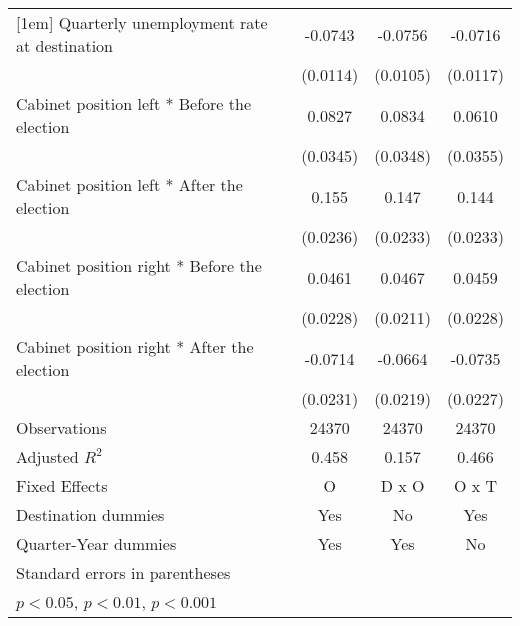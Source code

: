 \begin{table}[htbp]
\begin{tabular}{l*{3}{c}}
[1em]
Quarterly unemployment rate at destination&     -0.0743\sym{***}&     -0.0756\sym{***}&     -0.0716\sym{***}\\
                    &    (0.0114)         &    (0.0105)         &    (0.0117)         \\
[1em]
Cabinet position left * Before the election&      0.0827\sym{*}  &      0.0834\sym{*}  &      0.0610         \\
                    &    (0.0345)         &    (0.0348)         &    (0.0355)         \\
[1em]
Cabinet position left * After the election&       0.155\sym{***}&       0.147\sym{***}&       0.144\sym{***}\\
                    &    (0.0236)         &    (0.0233)         &    (0.0233)         \\
[1em]
Cabinet position right * Before the election&      0.0461\sym{*}  &      0.0467\sym{*}  &      0.0459\sym{*}  \\
                    &    (0.0228)         &    (0.0211)         &    (0.0228)         \\
[1em]
Cabinet position right * After the election&     -0.0714\sym{**} &     -0.0664\sym{**} &     -0.0735\sym{**} \\
                    &    (0.0231)         &    (0.0219)         &    (0.0227)         \\
\hline
Observations        &       24370         &       24370         &       24370         \\
Adjusted \(R^{2}\)  &       0.458         &       0.157         &       0.466         \\
Fixed Effects       &           O         &       D x O         &       O x T         \\
Destination dummies &         Yes         &          No         &         Yes         \\
Quarter-Year dummies&         Yes         &         Yes         &          No         \\
\hline\hline
\multicolumn{4}{l}{\footnotesize Standard errors in parentheses}\\
\multicolumn{4}{l}{\footnotesize \sym{*} \(p<0.05\), \sym{**} \(p<0.01\), \sym{***} \(p<0.001\)}\\
\end{tabular}
\end{table}
